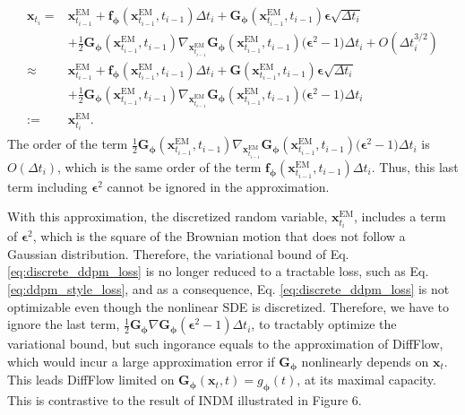 \documentclass{article}
\theoremstyle{definition}
\theoremstyle{remark}
\begin{document}
	\begin{align}\label{eq:exact_discretization}
	\begin{split}
	\mathbf{x}_{t_{i}}=&\mathbf{x}_{t_{i-1}}^{\text{EM}}+\mathbf{f}_{\bm{\phi}}(\mathbf{x}_{t_{i-1}}^{\text{EM}},t_{i-1})\Delta t_{i}+\mathbf{G}_{\bm{\phi}}(\mathbf{x}_{t_{i-1}}^{\text{EM}},t_{i-1})\bm{\epsilon}\sqrt{\Delta t_{i}}\\
	&+\frac{1}{2}\mathbf{G}_{\bm{\phi}}(\mathbf{x}_{t_{i-1}}^{\text{EM}},t_{i-1})\nabla_{\mathbf{x}_{t_{i-1}}^{\text{EM}}}\mathbf{G}_{\bm{\phi}}(\mathbf{x}_{t_{i-1}}^{\text{EM}},t_{i-1})\big(\bm{\epsilon}^{2}-1\big)\Delta t_{i}+O(\Delta t_{i}^{3/2})\\
	\approx&\mathbf{x}_{t_{i-1}}^{\text{EM}}+\mathbf{f}_{\bm{\phi}}(\mathbf{x}_{t_{i-1}}^{\text{EM}},t_{i-1})\Delta t_{i}+\mathbf{G}(\mathbf{x}_{t_{i-1}}^{\text{EM}},t_{i-1})\bm{\epsilon}\sqrt{\Delta t_{i}}\\
	&+\frac{1}{2}\mathbf{G}_{\bm{\phi}}(\mathbf{x}_{t_{i-1}}^{\text{EM}},t_{i-1})\nabla_{\mathbf{x}_{t_{i-1}}^{\text{EM}}}\mathbf{G}_{\bm{\phi}}(\mathbf{x}_{t_{i-1}}^{\text{EM}},t_{i-1})\big(\bm{\epsilon}^{2}-1\big)\Delta t_{i}\\
	:=&\mathbf{x}_{t_{i}}^{\text{EM}}.
	\end{split}
	\end{align}
	The order of the term $\frac{1}{2}\mathbf{G}_{\bm{\phi}}(\mathbf{x}_{t_{i-1}}^{\text{EM}},t_{i-1})\nabla_{\mathbf{x}_{t_{i-1}}^{\text{EM}}}\mathbf{G}_{\bm{\phi}}(\mathbf{x}_{t_{i-1}}^{\text{EM}},t_{i-1})\big(\bm{\epsilon}^{2}-1\big)\Delta t_{i}$ is $O(\Delta t_{i})$, which is the same order of the term $\mathbf{f}_{\bm{\phi}}(\mathbf{x}_{t_{i-1}}^{\text{EM}},t_{i-1})\Delta t_{i}$. Thus, this last term including $\bm{\epsilon}^{2}$ cannot be ignored in the approximation. 
	
	With this approximation, the discretized random variable, $\mathbf{x}_{t_{i}}^{\text{EM}}$, includes a term of $\bm{\epsilon}^{2}$, which is the square of the Brownian motion that does not follow a Gaussian distribution. Therefore, the variational bound of Eq. \eqref{eq:discrete_ddpm_loss} is no longer reduced to a tractable loss, such as Eq. \eqref{eq:ddpm_style_loss}, and as a consequence, Eq. \eqref{eq:discrete_ddpm_loss} is not optimizable even though the nonlinear SDE is discretized. Therefore, we have to ignore the last term, $\frac{1}{2}\mathbf{G}_{\bm{\phi}}\nabla\mathbf{G}_{\bm{\phi}}(\bm{\epsilon}^{2}-1)\Delta t_{i}$, to tractably optimize the variational bound, but such ingorance equals to the approximation of DiffFlow, which would incur a large approximation error if $\mathbf{G}_{\bm{\phi}}$ nonlinearly depends on $\mathbf{x}_{t}$. This leads DiffFlow limited on $\mathbf{G}_{\bm{\phi}}(\mathbf{x}_{t},t)=g_{\bm{\phi}}(t)$, at its maximal capacity. This is contrastive to the result of INDM illustrated in Figure 6.
	
\end{document}
